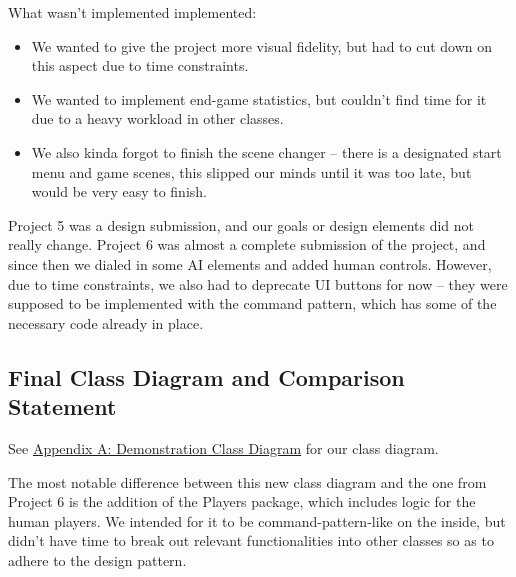 \documentclass[11pt]{amsart}
\begin{document}
What wasn't implemented implemented:
\begin{itemize}
    \item We wanted to give the project more visual fidelity, but had to cut down on this aspect due to time constraints.
    \item We wanted to implement end-game statistics, but couldn't find time for it due to a heavy workload in other classes.
    \item We also kinda forgot to finish the scene changer -- there is a designated start menu and game scenes, this slipped our minds until it was too late, but would be very easy to finish.
\end{itemize}

Project 5 was a design submission, and our goals or design elements did not really change. Project 6 was almost a complete submission of the project, and since then we dialed in some AI elements and added human controls. However, due to time constraints, we also had to deprecate UI buttons for now -- they were supposed to be implemented with the command pattern, which has some of the necessary code already in place.

\newpage
\subsection*{Final Class Diagram and Comparison Statement} \phantom{}





See \hyperref[sec:appendixa]{Appendix A: Demonstration Class Diagram} for our class diagram.

The most notable difference between this new class diagram and the one from Project 6 is the addition of the Players package, which includes logic for the human players. We intended for it to be command-pattern-like on the inside, but didn't have time to break out relevant functionalities into other classes so as to adhere to the design pattern.
\end{document}
